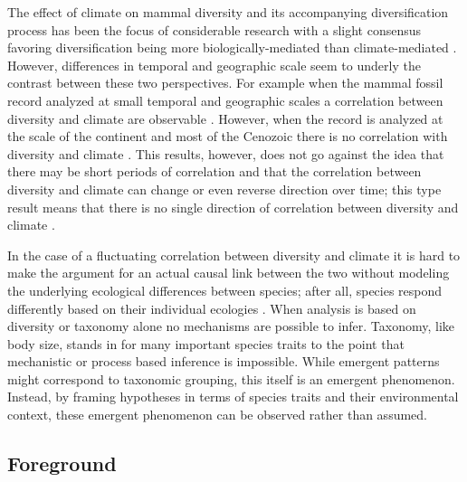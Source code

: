\documentclass[12pt,letterpaper]{article}
\begin{document}
The effect of climate on mammal diversity and its accompanying diversification process has been the focus of considerable research with a slight consensus favoring diversification being more biologically-mediated than climate-mediated \citep{Alroy1996a,Alroy2000g,Figueirido2012,Clyde1998a}. However, differences in temporal and geographic scale seem to underly the contrast between these two perspectives. For example when the mammal fossil record analyzed at small temporal and geographic scales a correlation between diversity and climate are observable \citep{Clyde1998a}. However, when the record is analyzed at the scale of the continent and most of the Cenozoic there is no correlation with diversity and climate \citep{Alroy2000g}. This results, however, does not go against the idea that there may be short periods of correlation and that the correlation between diversity and climate can change or even reverse direction over time; this type result means that there is no single direction of correlation between diversity and climate \citep{Figueirido2012}. 

In the case of a fluctuating correlation between diversity and climate it is hard to make the argument for an actual causal link between the two without modeling the underlying ecological differences between species; after all, species respond differently based on their individual ecologies \citep{Blois2009}. When analysis is based on diversity or taxonomy alone no mechanisms are possible to infer. Taxonomy, like body size, stands in for many important species traits to the point that mechanistic or process based inference is impossible. While emergent patterns might correspond to taxonomic grouping, this itself is an emergent phenomenon. Instead, by framing hypotheses in terms of species traits and their environmental context, these emergent phenomenon can be observed rather than assumed.



\subsection*{Foreground}
\end{document}
